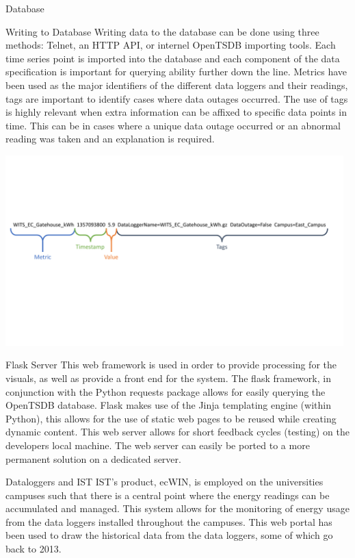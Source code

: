 \documentclass[8pt,xcolor={dvipsnames}]{beamer}
\begin{document}
{\begin{frame}{Database}
\begin{block}{Writing to Database}
	Writing data to the database can be done using three methods: Telnet, an HTTP API, or internel OpenTSDB importing tools.
	Each time series point is imported into the database and each component of the data specification is important for querying ability further down the line. Metrics have been used as the major identifiers of the different data loggers and their readings, tags are important to identify cases where data outages occurred. The use of tags is highly relevant when extra information can be affixed to specific data points in time. This can be in cases where a unique data outage occurred or an abnormal reading was taken and an explanation is required.
%	
	\begin{center}
		\includegraphics[width=0.98\textwidth, trim=13 210 15 180, clip]{WritingToTheDatabaseNotBold}
	\end{center}
\end{block}

\end{frame}


\begin{frame}{Flask Server}
This web framework is used in order to provide processing for the visuals, as well as provide a front end for the system.
The flask framework, in conjunction with the Python requests package allows for easily querying the OpenTSDB database.
Flask makes use of the Jinja templating engine (within Python), this allows for the use of static web pages to be reused while creating dynamic content.
This web server allows for short feedback cycles (testing) on the developers local machine. The web server can easily be ported to a more permanent solution on a dedicated server. 
\end{frame}

\begin{frame}{Dataloggers and IST}
IST's product, ecWIN, is employed on the universities campuses such that there is a central point where the energy readings can be accumulated and managed. This system allows for the monitoring of energy usage from the data loggers installed throughout the campuses.
This web portal has been used to draw the historical data from the data loggers, some of which go back to 2013.
\end{frame}

}
\end{document}
